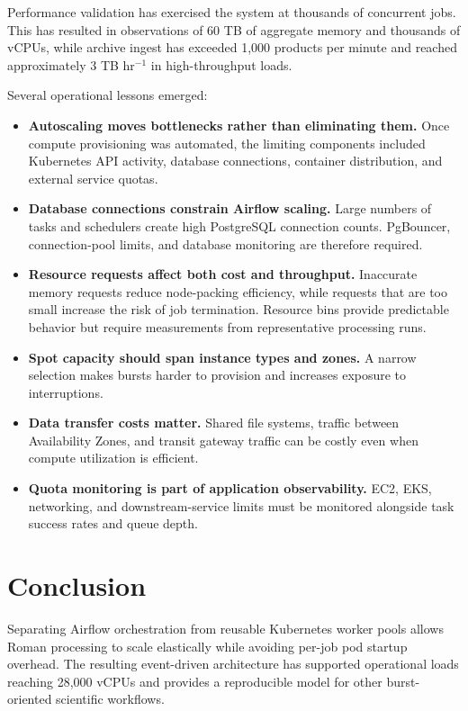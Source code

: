\documentclass[11pt,twoside]{article}
\begin{document}
Performance validation has exercised the system at thousands of concurrent jobs. This has resulted in observations of 60 TB of aggregate memory and thousands of vCPUs, while archive ingest has exceeded 1,000 products per minute and reached approximately 3 TB hr$^{-1}$ in high-throughput loads.

Several operational lessons emerged:

\begin{itemize}
  \item \textbf{Autoscaling moves bottlenecks rather than eliminating them.} Once compute provisioning was automated, the limiting components included Kubernetes API activity, database connections, container distribution, and external service quotas.
  
  \item \textbf{Database connections constrain Airflow scaling.} Large numbers of tasks and schedulers create high PostgreSQL connection counts. PgBouncer, connection-pool limits, and database monitoring are therefore required.
  
  \item \textbf{Resource requests affect both cost and throughput.} Inaccurate memory requests reduce node-packing efficiency, while requests that are too small increase the risk of job termination. Resource bins provide predictable behavior but require measurements from representative processing runs.
  
  \item \textbf{Spot capacity should span instance types and zones.} A narrow selection makes bursts harder to provision and increases exposure to interruptions.
  
  \item \textbf{Data transfer costs matter.} Shared file systems, traffic between Availability Zones, and transit gateway traffic can be costly even when compute utilization is efficient.
  
  \item \textbf{Quota monitoring is part of application observability.} EC2, EKS, networking, and downstream-service limits must be monitored alongside task success rates and queue depth. \end{itemize}

\section{Conclusion}

Separating Airflow orchestration from reusable Kubernetes worker pools allows Roman processing to scale elastically while avoiding per-job pod startup overhead. The resulting event-driven architecture has supported operational loads reaching 28,000 vCPUs and provides a reproducible model for other burst-oriented scientific workflows.


\end{document}
